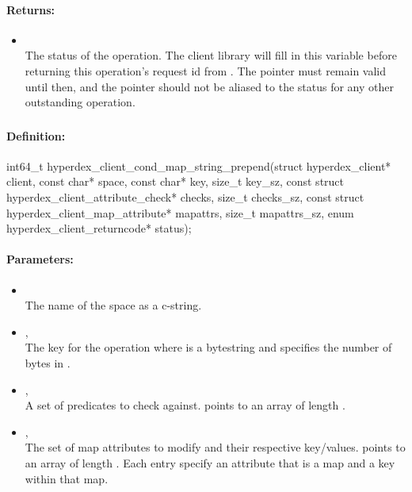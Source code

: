 \paragraph{Returns:}
\begin{itemize}[noitemsep]
\item {}\\
The status of the operation.  The client library will fill in this variable before returning this operation's request id from .  The pointer must remain valid until then, and the pointer should not be aliased to the status for any other outstanding operation.
\end{itemize}

\pagebreak
\subsubsection{}
\label{api:c:cond_map_string_prepend}


\paragraph{Definition:}
\begin{ccode}
int64_t hyperdex_client_cond_map_string_prepend(struct hyperdex_client* client,
        const char* space,
        const char* key, size_t key_sz,
        const struct hyperdex_client_attribute_check* checks, size_t checks_sz,
        const struct hyperdex_client_map_attribute* mapattrs, size_t mapattrs_sz,
        enum hyperdex_client_returncode* status);
\end{ccode}

\paragraph{Parameters:}
\begin{itemize}[noitemsep]
\item {}\\
The name of the space as a c-string.
\item {}, \\
The key for the operation where  is a bytestring and  specifies the number of bytes in .
\item {}, \\
A set of predicates to check against.   points to an array of length .
\item {}, \\
The set of map attributes to modify and their respective key/values.   points to an array of length .  Each entry specify an attribute that is a map and a key within that map.
\end{itemize}

